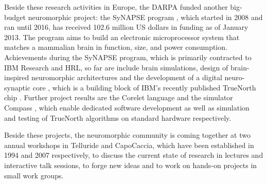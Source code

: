 Beside these research activities in Europe, the \ac{DARPA} funded another big-budget neuromorphic project: the \ac{SyNAPSE} program  \parencite{Srinivasa2012}, which started in \num{2008} and ran until \num{2016}, has received \num{102.6} million US dollars in funding as of January \num{2013}.
The program aims to build an electronic microprocessor system that matches a mammalian brain in function, size, and power consumption.
Achievements during the \ac{SyNAPSE} program, which is primarily contracted to IBM Research and \acs{HRL}, so far are include brain simulations, design of brain-inspired neuromorphic architectures \parencite{Nere2012} and the development of a digital neuro-synaptic core \parencite{Merolla2011}, which is a building block of IBM's recently published TrueNorth chip \parencite{Akopyan2015}.
Further project results are the Corelet language \parencite{Amir2013} and the simulator Compass \parencite{Preissl2012}, which enable dedicated software development as well as simulation and testing of TrueNorth algorithms on standard hardware respectively.

Beside these projects, the neuromorphic community is coming together at two annual  workshops in Telluride and CapoCaccia, which have been established in 1994 and 2007 respectively, to discuss the current state of research in lectures and interactive talk sessions, to forge new ideas and to work on hands-on projects in small work groups.

